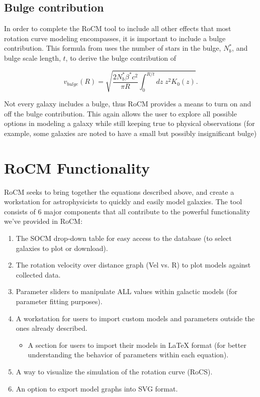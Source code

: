 \documentclass[conference]{IEEEtran-modified}
\begin{document}
\subsection{Bulge contribution}

In order to complete the RoCM tool to include all other effects that most rotation curve modeling encompasses, it is important to include a bulge contribution.  This formula from \cite{mannheim} uses the number of stars in the bulge, $N^*_b$, and bulge scale length, $t$, to derive the bulge contribution of

\begin{equation}
v_{bulge}(R) = \sqrt{\frac{2 N^*_b\beta^* c^2}{\pi R} \int_0^{R/t} dz\; z^2K_0(z)}.
\end{equation}

Not every galaxy includes a bulge, thus RoCM provides a means to turn on and off the bulge contribution.  This again allows the user to explore all possible options in modeling a galaxy while still keeping true to physical observations (for example, some galaxies are noted to have a small but possibly insignificant bulge)


\section{RoCM Functionality}

RoCM seeks to bring together the equations described above, and create a workstation for astrophysicists to quickly and easily model galaxies. The tool consists of 6 major components that all contribute to the powerful functionality we've provided in RoCM:
\begin{enumerate}
       \item The SOCM drop-down table for easy access to the database (to select galaxies to plot or download).
       \item The rotation velocity over distance graph (Vel vs. R) to plot models against collected data.
       \item Parameter sliders to manipulate ALL values within galactic models (for parameter fitting purposes).
       \item A workstation for users to import custom models and parameters outside the ones already described.
       \begin{itemize}
			\item A section for users to import their models in LaTeX format (for better understanding the behavior of parameters within each equation). 
       \end{itemize}
       \item A way to visualize the simulation of the rotation curve (RoCS).
       \item An option to export model graphs into SVG format.

\end{enumerate}
\end{document}
